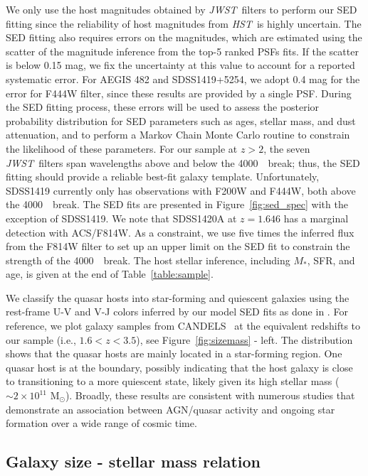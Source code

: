 \documentclass[twocolumn,]{aastex631}
\newcommand{\smass}{{$M_*$}}
\newcommand{\hst}{{\it HST}}
\newcommand{\jwst}{{\it JWST}}
\newcommand{\angstrom}{\text{\normalfont\AA}}
\begin{document}
We only use the host magnitudes obtained by \jwst\ filters to perform our SED fitting since the reliability of host magnitudes from \hst\ is highly uncertain. 
The SED fitting also requires errors on the magnitudes, which are estimated using the scatter of the magnitude inference from the top-5 ranked PSFs fits. If the scatter is below 0.15 mag, we fix the uncertainty at this value to account for a reported systematic error.
For AEGIS 482 and SDSS1419+5254, we adopt 0.4 mag for the error for F444W filter, since these results are provided by a single PSF.
During the SED fitting process, these errors will be used to assess the posterior probability distribution for SED parameters such as ages, stellar mass, and dust attenuation, and to perform a Markov Chain Monte Carlo routine to constrain the likelihood of these parameters.
For our sample at $z>2$, the seven \jwst\ filters span wavelengths above and below the 4000~\angstrom\ break; thus, the SED fitting should provide a reliable best-fit galaxy template. Unfortunately, SDSS1419 currently only has observations with F200W and F444W, both above the 4000~\angstrom\ break. The SED fits are presented in Figure~\ref{fig:sed_spec} with the exception of SDSS1419. We note that SDSS1420A at $z=1.646$ has a marginal detection with ACS/F814W. As a constraint, we use five times the inferred flux from the F814W filter to set up an upper limit on the SED fit to constrain the strength of the 4000~\angstrom\ break. The host stellar inference, including \smass, SFR, and age, is given at the end of Table~\ref{table:sample}. 

We classify the quasar hosts into star-forming and quiescent galaxies using the rest-frame U-V and V-J colors inferred by our model SED fits as done in \citet{vdW+2014}. For reference, we plot galaxy samples from CANDELS~\citep{vdW+2012, vdW+2014} at the equivalent redshifts to our sample (i.e., $1.6<z<3.5$), see Figure~\ref{fig:sizemass} - left. The distribution shows that the quasar hosts are mainly located in a star-forming region. One quasar host is at the boundary, possibly indicating that the host galaxy is close to transitioning to a more quiescent state, likely given its high stellar mass ($\sim2\times10^{11}$ M$_{\odot}$). Broadly, these results are consistent with numerous studies that demonstrate an association between AGN/quasar activity and ongoing star formation over a wide range of cosmic time.

\subsection{Galaxy size - stellar mass relation}
\end{document}
